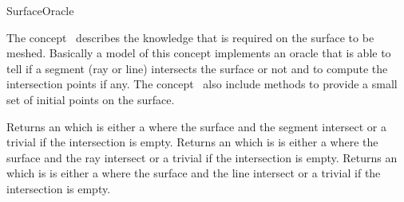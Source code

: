 

\begin{ccRefConcept}{SurfaceOracle}


\ccDefinition
  
The concept \ccRefName\ describes the knowledge that is required on the
surface to be meshed. Basically a model of this concept
implements an oracle that is able to tell if a segment
(ray or line) intersects the surface or not
and to compute the intersection
points if any. The concept \ccRefName\ also include methods  to provide
a small set of initial points on the surface.


\ccTypes




\ccCreation
{}  %


\ccOperations


{ Returns an   which is either a  where
the surface and the segment  intersect or
a trivial  if the intersection is empty.}
\ccGlue
{}
{ Returns an   which is is either a  where
the surface and the ray  intersect or
a trivial  if the intersection is empty.}
\ccGlue
{}
{ Returns an   which is is either a  where
 the surface and the line  intersect or
a trivial  if the intersection is empty.}


\end{ccRefConcept}
